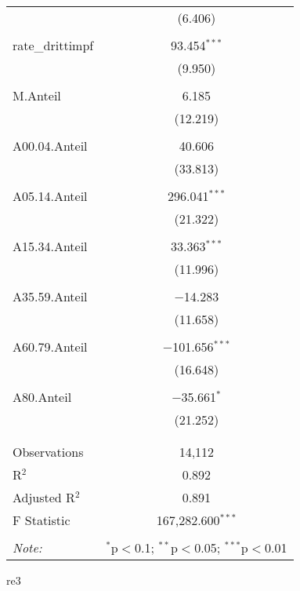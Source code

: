\documentclass{article}
\begin{document}
\begin{table}[!htbp]
\begin{tabular}{@{\extracolsep{5pt}}lc}
  & (6.406) \\ 
  & \\ 
 rate\_drittimpf & 93.454$^{***}$ \\ 
  & (9.950) \\ 
  & \\ 
 M.Anteil & 6.185 \\ 
  & (12.219) \\ 
  & \\ 
 A00.04.Anteil & 40.606 \\ 
  & (33.813) \\ 
  & \\ 
 A05.14.Anteil & 296.041$^{***}$ \\ 
  & (21.322) \\ 
  & \\ 
 A15.34.Anteil & 33.363$^{***}$ \\ 
  & (11.996) \\ 
  & \\ 
 A35.59.Anteil & $-$14.283 \\ 
  & (11.658) \\ 
  & \\ 
 A60.79.Anteil & $-$101.656$^{***}$ \\ 
  & (16.648) \\ 
  & \\ 
 A80.Anteil & $-$35.661$^{*}$ \\ 
  & (21.252) \\ 
  & \\ 
\hline \\[-1.8ex] 
Observations & 14,112 \\ 
R$^{2}$ & 0.892 \\ 
Adjusted R$^{2}$ & 0.891 \\ 
F Statistic & 167,282.600$^{***}$ \\ 
\hline 
\hline \\[-1.8ex] 
\textit{Note:}  & \multicolumn{1}{r}{$^{*}$p$<$0.1; $^{**}$p$<$0.05; $^{***}$p$<$0.01} \\ 
\end{tabular} 
\end{table} 



re3
\end{document}

